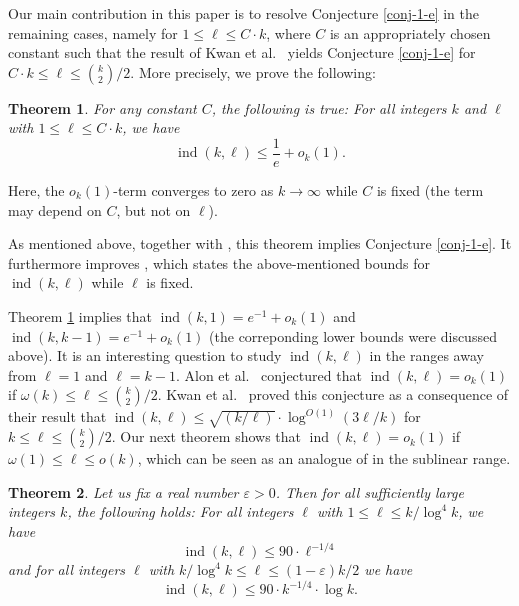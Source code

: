 \documentclass[11pt]{article}
\newtheorem{theorem}{Theorem}[section]
\theoremstyle{definition}
\numberwithin{equation}{section}
\begin{document}
Our main contribution in this paper is to resolve Conjecture \ref{conj-1-e} in the remaining cases, namely for $1\leq \ell\leq C\cdot k$, where $C$ is an appropriately chosen constant such that the result of Kwan et al.\  \cite{kwan-et-al} yields Conjecture \ref{conj-1-e} for $C\cdot k\leq \ell\leq  {k\choose 2}/2$. More precisely, we prove the following:

\begin{theorem}\label{thm-graph-1-e}For any constant $C$, the following is true: For all integers $k$ and $\ell$ with $1\leq \ell\leq C\cdot k$, we have
\[\operatorname{ind}(k,\ell)\leq \frac{1}{e}+o_k(1).\]
\end{theorem}
Here, the $o_k(1)$-term converges to zero as $k\to\infty$ while $C$ is fixed (the term may depend on $C$, but not on $\ell$).

As mentioned above, together with \cite[Theorem 1.1]{kwan-et-al}, this theorem implies Conjecture \ref{conj-1-e}. It furthermore improves \cite[Theorem 1.6]{alon-et-al}, which states the above-mentioned bounds for $\operatorname{ind}(k,\ell)$ while $\ell$ is fixed.

Theorem \ref{thm-graph-1-e} implies that $\operatorname{ind}(k,1)=  e^{-1}+o_k(1)$ and $\operatorname{ind}(k,k-1)=  e^{-1}+o_k(1)$ (the correponding lower bounds were discussed above). It is an interesting question to study $\operatorname{ind}(k,\ell)$ in the ranges away from $\ell=1$ and $\ell=k-1$. Alon et al.\ \cite[Conjecture 6.1]{alon-et-al} conjectured that $\operatorname{ind}(k,\ell)=o_k(1)$ if $\omega(k)\leq \ell\leq {k\choose 2}/2$. Kwan et al.\  \cite{kwan-et-al} proved this conjecture as a consequence of their result that $\operatorname{ind}(k,\ell)\leq \sqrt{(k/\ell)}\cdot \log^{O(1)}(3\ell/k)$ for $k\leq \ell\leq  {k\choose 2}/2$. Our next theorem shows that $\operatorname{ind}(k,\ell)=o_k(1)$ if  $\omega(1)\leq \ell\leq o(k)$, which can be seen as an analogue of \cite[Conjecture 6.1]{alon-et-al} in the sublinear range.

\begin{theorem}\label{thm-graph-o1}Let us fix a real number $\varepsilon>0$. Then for all sufficiently large integers $k$, the following holds: For all integers $\ell$ with $1\leq \ell\leq k/\log^4 k$, we have
\[\operatorname{ind}(k,\ell)\leq 90\cdot \ell^{-1/4}\]
and for all integers $\ell$ with $k/\log^4 k \leq \ell\leq (1-\varepsilon)k/2$ we have
\[\operatorname{ind}(k,\ell)\leq 90\cdot k^{-1/4} \cdot \log k.\]
\end{theorem}
\end{document}
